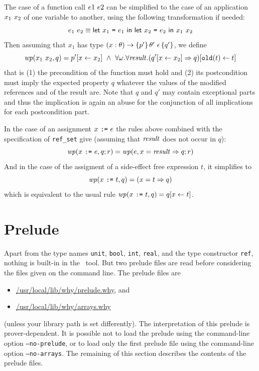 \documentclass[a4paper,12pt]{report}
\begin{document}
The case of a function call $e1~e2$ can be simplified to the
case of an application $x_1~x_2$ of one variable to another,
using the following transformation if needed:
\begin{displaymath}
    e_1~e_2 \equiv 
      \mathsf{let}~x_1~\texttt{=}~e_1~\mathsf{in}~\mathsf{let}~x_2~\texttt{=}~e_2~\mathsf{in}~x_1~x_2
\end{displaymath}
Then assuming that $x_1$ has type
$(x:\theta)\rightarrow\{p'\}\,\theta'~\epsilon\,\{q'\}$, we define
\begin{displaymath}
  \mathit{wp}(x_1~x_2,q) = p'[x\leftarrow x_2] ~\land~
  \forall\omega. \forall\mathit{result}. 
    (q'[x\leftarrow x_2] \Rightarrow q)[\mathtt{old}(t)\leftarrow t]
\end{displaymath}
that is (1) the precondition of the function must hold and (2) its
postcondition must imply the expected property $q$ whatever the
values of the modified references and of the result are.
Note that $q$ and $q'$ may contain exceptional parts and thus the
implication is again an abuse for the conjunction of all implications for
each postcondition part.

In the case of an assignment $x~\texttt{:=}~e$ the rules above combined
with the specification of \texttt{ref\_set} give
(assuming that $\mathit{result}$ does not occur in $q$):
\begin{displaymath}
  \mathit{wp}(x~\texttt{:=}~e,q;r) = \mathit{wp}(e,x=\mathit{result} \Rightarrow q;r) 
\end{displaymath}
And in the case of the assigment of a side-effect free expression $t$,
it simplifies to
\begin{displaymath}
  \mathit{wp}(x~\texttt{:=}~t,q) = (x=t \Rightarrow q)
\end{displaymath}
which is equivalent to the usual rule $\mathit{wp}(x~\texttt{:=}~t,q) =
q[x\leftarrow t]$.

\section{Prelude}
\label{prelude}

Apart from the type names \texttt{unit}, \texttt{bool}, \texttt{int},
\texttt{real}, and the type constructor \texttt{ref}, nothing is
built-in in the \why\ tool. But two prelude 
files are read before considering the files given on the command
line. The prelude files are
\begin{itemize}
\item \url{/usr/local/lib/why/prelude.why}, and
\item \url{/usr/local/lib/why/arrays.why}
\end{itemize}
(unless your library path is set differently).
The interpretation of this prelude is prover-dependent. 
It is possible not to load the prelude using the command-line option
\texttt{--no-prelude}, or to load only the first prelude file using
the command-line option \texttt{--no-arrays}.
The remaining of this section describes the contents of the prelude files.
\end{document}
